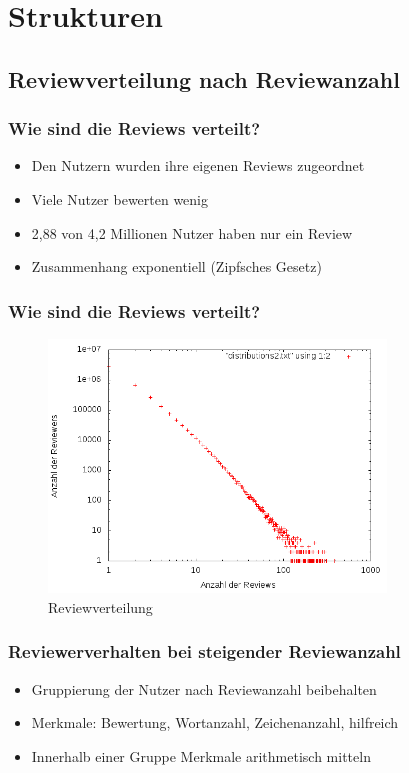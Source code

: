 \documentclass{beamer}
\begin{document}
	\section{Strukturen}
	\begin{frame}
	\subsection{Reviewverteilung nach Reviewanzahl}
	\frametitle{Wie sind die Reviews verteilt?}
	\begin{itemize}
	\item Den Nutzern wurden ihre eigenen Reviews zugeordnet
	\item Viele Nutzer bewerten wenig
	\item 2,88 von 4,2 Millionen Nutzer haben nur ein Review 
	\item Zusammenhang exponentiell (Zipfsches Gesetz)
	\end{itemize}
	\end{frame}
	\frametitle{Wie sind die Reviews verteilt?}	
	\begin{frame}
	\begin{figure}[H]
	\centering
    \includegraphics[width=0.8\textwidth]{bild.png}
    \caption{Reviewverteilung}
	\end{figure}
	\end{frame}
	
	\begin{frame}
	\frametitle{Reviewerverhalten bei steigender Reviewanzahl}
	\begin{itemize}
	\item Gruppierung der Nutzer nach Reviewanzahl beibehalten
	\item Merkmale: Bewertung, Wortanzahl, Zeichenanzahl, hilfreich
	\item Innerhalb einer Gruppe Merkmale arithmetisch mitteln
	\end{itemize}
	\end{frame}
	
\end{document}
